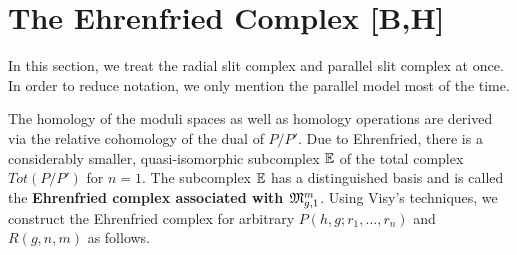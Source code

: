 \section{The Ehrenfried Complex [B,H]}
\label{cellular_models:ehrenfried}
In this section, we treat the radial slit complex and parallel slit complex at once.
In order to reduce notation, we only mention the parallel model most of the time.

The homology of the moduli spaces as well as homology operations are derived via the relative cohomology of the dual of $P/P'$.
Due to Ehrenfried, there is a considerably smaller, quasi-isomorphic subcomplex $\E$ of the total complex $Tot(P/P')$ for $n=1$.
The subcomplex $\E$ has a distinguished basis and is called the {\bf Ehrenfried complex associated with $\Modspc[1]$}.
Using Visy's techniques, we construct the Ehrenfried complex for arbitrary $P(h,g;r_1, \ldots, r_n)$ and $R(g,n,m)$ as follows.



